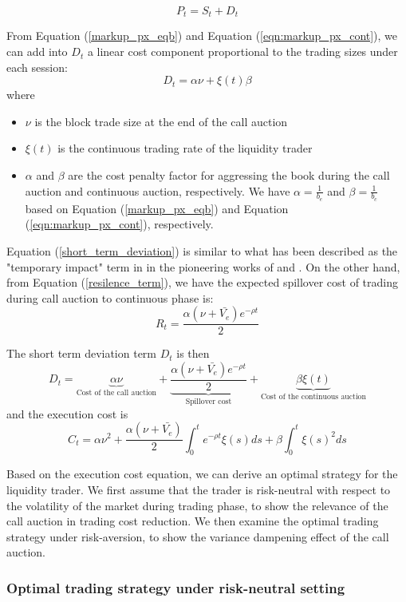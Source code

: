 \[
  P_t = S_t + D_t
\]

From Equation (\ref{markup_px_eqb}) and Equation (\ref{eqn:markup_px_cont}), we can add into $D_t$ a linear cost component proportional to the trading sizes under each session:
\begin{equation}\label{short_term_deviation}
  D_t = \alpha \nu + \xi(t) \beta
\end{equation}
where
\begin{itemize}
  \item $\nu$ is the block trade size at the end of the call auction
  \item $\xi(t)$ is the continuous trading rate of the liquidity trader
  \item $\alpha$ and $\beta$ are the cost penalty factor for aggressing the book during the call auction and continuous auction, respectively. We have $\alpha=\frac{1}{b_e}$ and $\beta=\frac{1}{b_c}$ based on Equation (\ref{markup_px_eqb}) and Equation (\ref{eqn:markup_px_cont}), respectively.
\end{itemize}
Equation (\ref{short_term_deviation}) is similar to what has been described as the "temporary impact" term in in the pioneering works of \cite{BertimasLo1999} and \cite{Almgren2000}. On the other hand, from Equation (\ref{resilence_term}), we have the expected spillover cost of trading during call auction to continuous phase is:
\[
  R_t = \frac{\alpha (\nu + \bar{V_e}) e^{-\rho t}}{2}
\]

The short term deviation term $D_t$ is then
\[
  D_t = \underbrace{\alpha \nu }_\text{Cost of the call auction} +
  \underbrace{\frac{\alpha (\nu + \bar{V_e}) e^{-\rho t}}{2}}_\text{Spillover cost} +  \underbrace{\beta \xi(t)}_\text{Cost of the continuous auction}
\]
and the execution cost is
\begin{equation}\label{eqn:cost_equation_all}
  C_t = \alpha \nu^2 + \frac{\alpha (\nu + \bar{V_e})}{2} \int_0^t e^{-\rho t} \xi(s) ds + \beta \int_0^t \xi(s)^2 ds
\end{equation}

Based on the execution cost equation, we can derive an optimal strategy for the liquidity trader. {\color{red} We first assume that the trader is risk-neutral with respect to the volatility of the market during trading phase, to show the relevance of the call auction in trading cost reduction. We then examine the optimal trading strategy under risk-aversion, to show the variance dampening effect of the call auction.}

\subsubsection{Optimal trading strategy under risk-neutral setting}\label{sec:risk_neutral_opt_strat}


